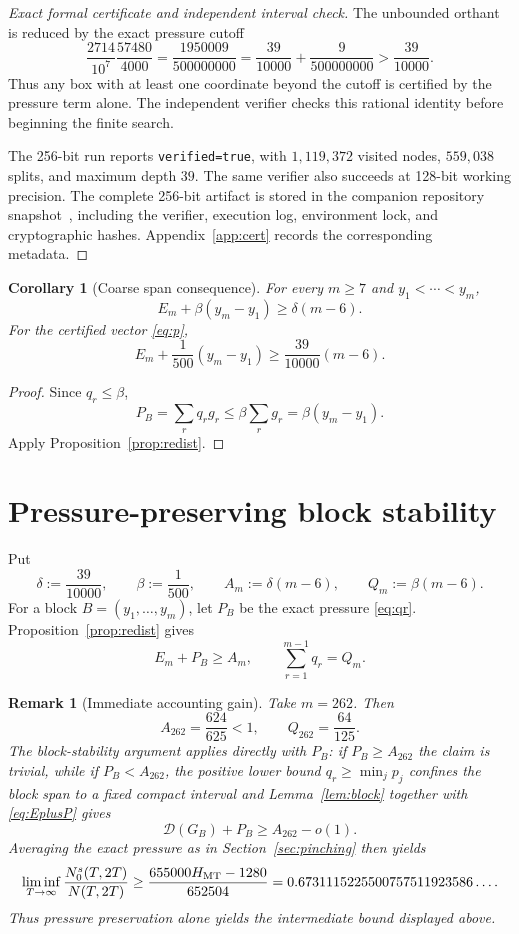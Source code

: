 \documentclass[11pt]{article}
\newtheorem{corollary}[theorem]{Corollary}
\newtheorem{remark}[theorem]{Remark}
\begin{document}
\begin{proof}[Exact formal certificate and independent interval check]
The unbounded orthant is reduced by the exact pressure cutoff
\[
 \frac{2714}{10^7}\frac{57480}{4000}
 =\frac{1950009}{500000000}
 =\frac{39}{10000}+\frac{9}{500000000}
 >\frac{39}{10000}.
\]
Thus any box with at least one coordinate beyond the cutoff is certified by
the pressure term alone.  The independent verifier checks this rational
identity before beginning the finite search.

The 256-bit run reports \texttt{verified=true}, with $1{,}119{,}372$
visited nodes, $559{,}038$ splits, and maximum depth $39$.  The same verifier
also succeeds at 128-bit working precision.  The complete 256-bit artifact is
stored in the companion repository snapshot~\cite{Hurtado26Artifact},
including the verifier, execution log, environment lock, and cryptographic
hashes.  Appendix~\ref{app:cert} records the corresponding metadata.
\end{proof}

\begin{corollary}[Coarse span consequence]\label{cor:energy}
For every \(m\ge7\) and \(y_1<\cdots<y_m\),
\[
 E_m+\beta(y_m-y_1)\ge\delta(m-6).
\]
For the certified vector \eqref{eq:p},
\[
 E_m+\frac1{500}(y_m-y_1)
 \ge\frac{39}{10000}(m-6).
\]
\end{corollary}

\begin{proof}
Since \(q_r\le\beta\),
\[
 P_B=\sum_rq_rg_r
 \le\beta\sum_rg_r
 =\beta(y_m-y_1).
\]
Apply Proposition~\ref{prop:redist}.
\end{proof}


\section{Pressure-preserving block stability}\label{sec:blockstability}

Put
\[
 \delta:=\frac{39}{10000},
 \qquad
 \beta:=\frac1{500},
 \qquad
 A_m:=\delta(m-6),
 \qquad
 Q_m:=\beta(m-6).
\]
For a block \(B=(y_1,\ldots,y_m)\), let \(P_B\) be the exact pressure
\eqref{eq:qr}.  Proposition~\ref{prop:redist} gives
\begin{equation}\label{eq:EplusP}
 E_m+P_B\ge A_m,
 \qquad
 \sum_{r=1}^{m-1}q_r=Q_m.
\end{equation}

\begin{remark}[Immediate accounting gain]\label{rem:accounting-gain}
Take \(m=262\).  Then
\[
 A_{262}=\frac{624}{625}<1,
 \qquad
 Q_{262}=\frac{64}{125}.
\]
The block-stability argument applies directly with \(P_B\): if
\(P_B\ge A_{262}\) the claim is trivial, while if \(P_B<A_{262}\), the
positive lower bound
\(q_r\ge\min_jp_j\) confines the block span to a fixed compact interval and
Lemma~\ref{lem:block} together with \eqref{eq:EplusP} gives
\[
 \mathcal D(G_B)+P_B\ge A_{262}-o(1).
\]
Averaging the exact pressure as in Section~\ref{sec:pinching} then yields
\[
 \liminf_{T\to\infty}\frac{N_0^s(T,2T)}{N(T,2T)}
 \ge
 \frac{655000H_{\rm MT}-1280}{652504}
 =
 0.6731115225500757511923586\ldots .
\]
Thus pressure preservation alone yields the intermediate bound displayed above.
\end{remark}
\end{document}

